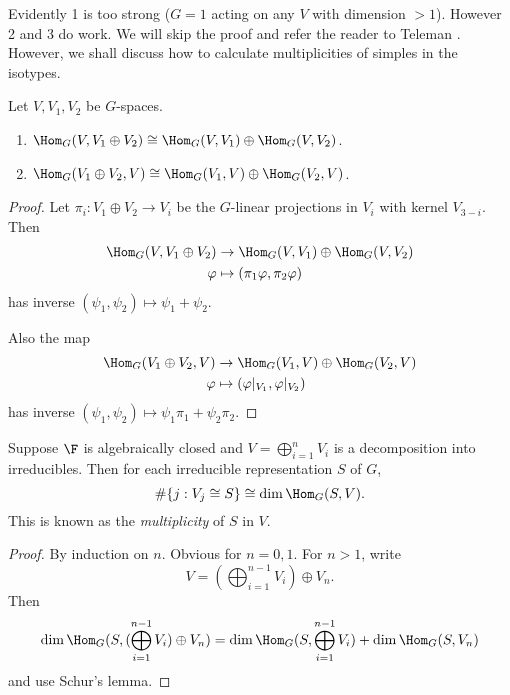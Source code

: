 \documentclass[a4paper]{article}
\begin{document}
Evidently 1 is too strong (\(G = 1\) acting on any \(V\) with dimension \(> 1\)). However 2 and 3 do work. We will skip the proof and refer the reader to Teleman . However, we shall discuss how to calculate multiplicities of simples in the isotypes.

\begin{lemma}
  Let \(V, V_1, V_2\) be \(G\)-spaces.
  \begin{enumerate}
  \item \(\Hom_G(V, V_1 \oplus V_2) \cong \Hom_G(V, V_1) \oplus \Hom_G(V, V_2)\).
  \item \(\Hom_G(V_1 \oplus V_2, V) \cong \Hom_G(V_1, V) \oplus \Hom_G(V_2, V)\).
  \end{enumerate}
\end{lemma}

\begin{proof}
  Let \(\pi_i: V_1 \oplus V_2 \to V_i\) be the \(G\)-linear projections in \(V_i\) with kernel \(V_{3 - i}\). Then
  \begin{align*}
    \Hom_G(V, V_1 \oplus V_2) &\to \Hom_G(V, V_1) \oplus \Hom_G(V, V_2) \\
    \varphi &\mapsto (\pi_1 \varphi, \pi_2 \varphi)
  \end{align*}
  has inverse \((\psi_1, \psi_2) \mapsto \psi_1 + \psi_2\).

  Also the map
  \begin{align*}
    \Hom_G(V_1 \oplus V_2, V) &\to \Hom_G(V_1, V) \oplus \Hom_G(V_2, V) \\
    \varphi &\mapsto (\varphi|_{V_1}, \varphi|_{V_2})
  \end{align*}
  has inverse \((\psi_1, \psi_2) \mapsto \psi_1 \pi_1 + \psi_2 \pi_2\).
\end{proof}

\begin{corollary}
  Suppose \(\F\) is algebraically closed and \(V = \bigoplus_{i = 1}^n V_i\) is a decomposition into irreducibles. Then for each irreducible representation \(S\) of \(G\),
  \[
    \# \{j: V_j \cong S\} \cong \dim \Hom_G(S, V).
  \]
  This is known as the \emph{multiplicity} of \(S\) in \(V\).
\end{corollary}

\begin{proof}
  By induction on \(n\). Obvious for \(n = 0, 1\). For \(n > 1\), write
  \[
    V = (\bigoplus_{i = 1}^{n - 1} V_i) \oplus V_n.
  \]
  Then
  \[
    \dim \Hom_G(S, (\bigoplus_{i = 1}^{n - 1} V_i) \oplus V_n)
    = \dim \Hom_G(S, \bigoplus_{i = 1}^{n - 1} V_i) + \dim \Hom_G(S, V_n)
  \]
  and use Schur's lemma.
\end{proof}
\end{document}
